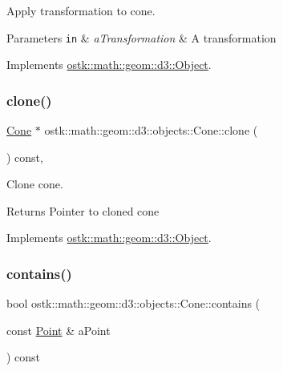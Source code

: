 Apply transformation to cone. 


\begin{DoxyParams}[1]{Parameters}
\mbox{\tt in}  & {\em a\+Transformation} & A transformation \\
\hline
\end{DoxyParams}


Implements \hyperlink{classostk_1_1math_1_1geom_1_1d3_1_1_object_ae9194dd6d2bb4df09292ffc84dccdb1d}{ostk\+::math\+::geom\+::d3\+::\+Object}.

\mbox{\label{classostk_1_1math_1_1geom_1_1d3_1_1objects_1_1_cone_a656d9720f23ab4e04bbb87dc85f9585a}} 
\subsubsection{\texorpdfstring{clone()}{clone()}}
{\footnotesize\ttfamily \hyperlink{classostk_1_1math_1_1geom_1_1d3_1_1objects_1_1_cone}{Cone} $\ast$ ostk\+::math\+::geom\+::d3\+::objects\+::\+Cone\+::clone (\begin{DoxyParamCaption}{ }\end{DoxyParamCaption}) const\hspace{0.3cm}{\ttfamily [override]}, {\ttfamily [virtual]}}



Clone cone. 

\begin{DoxyReturn}{Returns}
Pointer to cloned cone 
\end{DoxyReturn}


Implements \hyperlink{classostk_1_1math_1_1geom_1_1d3_1_1_object_a676013f9555f6492687f9809b2db887b}{ostk\+::math\+::geom\+::d3\+::\+Object}.

\mbox{\label{classostk_1_1math_1_1geom_1_1d3_1_1objects_1_1_cone_a97717dcecc3db77e980644be84485aba}} 
\subsubsection{\texorpdfstring{contains()}{contains()}\hspace{0.1cm}{\footnotesize\ttfamily [1/6]}}
{\footnotesize\ttfamily bool ostk\+::math\+::geom\+::d3\+::objects\+::\+Cone\+::contains (\begin{DoxyParamCaption}\item[{const \hyperlink{classostk_1_1math_1_1geom_1_1d3_1_1objects_1_1_point}{Point} \&}]{a\+Point }\end{DoxyParamCaption}) const}



